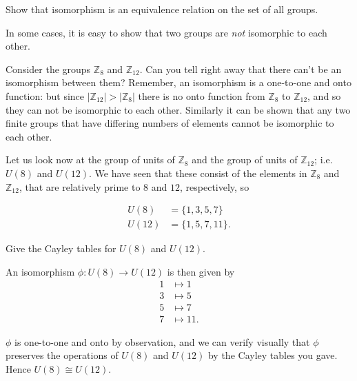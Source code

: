 \begin{exercise}\label{exercise:isomorph:isomorph_equiv_reln}
Show that isomorphism is an equivalence relation on the set of all groups. 
\end{exercise}

In some cases, it is easy to show that two groups are \emph{not} isomorphic to each other.

\begin{example}\label{example:isomorph:nonisom}
Consider the groups ${\mathbb Z}_8$ and ${\mathbb Z}_{12}$. Can you tell right away that there can't be an isomorphism between them?  Remember, an isomorphism is a one-to-one and onto function: but since 
$|{\mathbb Z}_{12}|>|{\mathbb Z}_{8}|$ there is no onto function from ${\mathbb Z}_8$ to ${\mathbb Z}_{12}$, and so they can not be isomorphic to each other.  Similarly it can be shown that any two finite groups that have differing numbers of elements cannot be isomorphic to each other.
\end{example}

\begin{example}\label{example:isomorph:units}
Let us look now at  the group of units of ${\mathbb Z}_8$ and the group of units of ${\mathbb Z}_{12}$; i.e. $U(8)$ and $U(12)$.  We have seen that these  consist of the elements in ${\mathbb Z}_8$ and ${\mathbb Z}_{12}$, that are relatively prime to $8$ and $12$, respectively, so

\begin{align*}
U(8) & = \{1, 3, 5, 7 \} \\
U(12) & = \{1, 5, 7, 11 \}.
\end{align*}

\begin{exercise}\label{exercise:isomorph:U8_U12_Cayley}
Give the Cayley tables for $U(8)$ and $U(12)$.
\end{exercise}

An isomorphism $\phi : U(8) \rightarrow U(12)$ is then given by
\begin{align*}
1 & \mapsto  1 \\
3 & \mapsto  5 \\
5 & \mapsto  7 \\
7 & \mapsto  11.
\end{align*}

$\phi$ is one-to-one and onto by observation, and we can verify visually that $\phi$ preserves the operations of $U(8)$ and $U(12)$ by the Cayley tables you gave.  Hence $U(8) \cong U(12)$.
\end{example}

